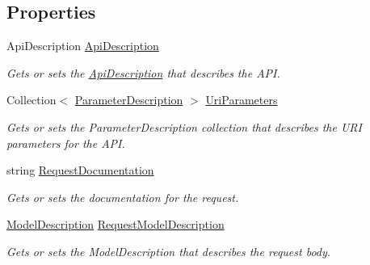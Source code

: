 \subsection*{Properties}
\begin{DoxyCompactItemize}
\item 
Api\+Description \hyperlink{class_w_s1aarsproeve_1_1_areas_1_1_help_page_1_1_models_1_1_help_page_api_model_aa8a3ac8bc355b4dd059e05300678b753}{Api\+Description}
\begin{DoxyCompactList}\small\item\em Gets or sets the \hyperlink{class_w_s1aarsproeve_1_1_areas_1_1_help_page_1_1_models_1_1_help_page_api_model_aa8a3ac8bc355b4dd059e05300678b753}{Api\+Description} that describes the A\+P\+I. \end{DoxyCompactList}\item 
Collection$<$ \hyperlink{class_w_s1aarsproeve_1_1_areas_1_1_help_page_1_1_model_descriptions_1_1_parameter_description}{Parameter\+Description} $>$ \hyperlink{class_w_s1aarsproeve_1_1_areas_1_1_help_page_1_1_models_1_1_help_page_api_model_adf89274591dc9d880d387f01a31b108b}{Uri\+Parameters}
\begin{DoxyCompactList}\small\item\em Gets or sets the Parameter\+Description collection that describes the U\+R\+I parameters for the A\+P\+I. \end{DoxyCompactList}\item 
string \hyperlink{class_w_s1aarsproeve_1_1_areas_1_1_help_page_1_1_models_1_1_help_page_api_model_a95a0bdebba9ed507fa356b419b45e50a}{Request\+Documentation}
\begin{DoxyCompactList}\small\item\em Gets or sets the documentation for the request. \end{DoxyCompactList}\item 
\hyperlink{class_w_s1aarsproeve_1_1_areas_1_1_help_page_1_1_model_descriptions_1_1_model_description}{Model\+Description} \hyperlink{class_w_s1aarsproeve_1_1_areas_1_1_help_page_1_1_models_1_1_help_page_api_model_ad5683519ab71ee557a219aa805003efa}{Request\+Model\+Description}
\begin{DoxyCompactList}\small\item\em Gets or sets the Model\+Description that describes the request body. \end{DoxyCompactList}\item 

\end{DoxyCompactItemize}
